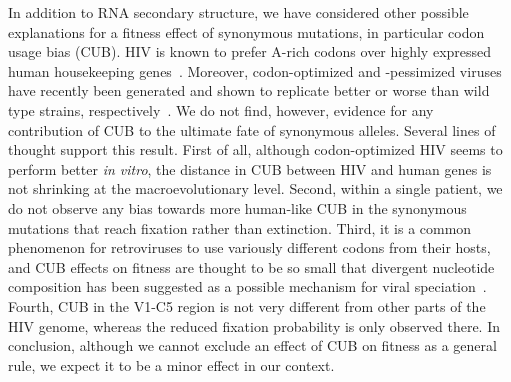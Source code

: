 \documentclass[rmp, twocolumn]{revtex4}
\begin{document}
In addition to RNA secondary structure, we have considered other possible
explanations for a fitness effect of synonymous mutations, in particular codon
usage bias (CUB). HIV is known to prefer A-rich codons over highly expressed
human housekeeping genes~\citep{jenkins_extent_2003}. Moreover, codon-optimized
and -pessimized viruses have recently been generated and shown to replicate
better or worse than wild type strains,
respectively~\citep{li_codon-usage-based_2012, ngumbela_quantitative_2008,
coleman_virus_2008}. We do not find, however, evidence for any contribution of
CUB to the ultimate fate of synonymous alleles. Several lines of thought support
this result. First of all, although codon-optimized HIV seems to perform better
{\it in vitro}, the distance in CUB between HIV and human genes is not shrinking
at the macroevolutionary level. Second, within a single patient, we do not
observe any bias towards more human-like CUB in the synonymous mutations that
reach fixation rather than extinction. Third, it is a common phenomenon for
retroviruses to use variously different codons from their hosts, and CUB effects
on fitness are thought to be so small that divergent nucleotide composition has
been suggested as a possible mechanism for viral
speciation~\citep{bronson_nucleotide_1994}. Fourth, CUB in the V1-C5 region is
not very different from other parts of the HIV genome, whereas the reduced
fixation probability is only observed there. In conclusion, although we cannot
exclude an effect of CUB on fitness as a general rule, we expect it to be a
minor effect in our context.
\end{document}
